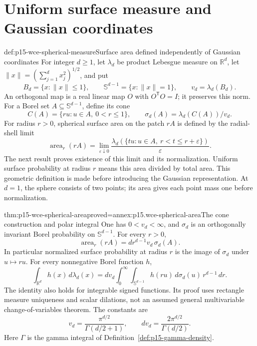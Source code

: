 \section{Uniform surface measure and Gaussian coordinates}
\label{sec:p15-wce-sphere}

\begin{hbdefinition}{def:p15-wce-spherical-measure}{Surface area defined independently of Gaussian coordinates}
For integer \(d\geq1\), let \(\lambda_d\) be product Lebesgue
measure on \(\mathbb R^d\), let
\(\|x\|=(\sum_{j=1}^d x_j^2)^{1/2}\), and put
\[
 B_d=\{x:\|x\|\leq1\},\qquad
 \mathbb S^{d-1}=\{x:\|x\|=1\},\qquad v_d=\lambda_d(B_d).
 \]
An orthogonal map is a real linear map \(O\) with
\(O^{\mathsf T}O=I\); it preserves this norm.
For a Borel set \(A\subseteq\mathbb S^{d-1}\), define its cone
\[
 C(A)=\{ru:u\in A,\ 0<r\leq1\},\qquad
 \sigma_d(A)=\lambda_d(C(A))/v_d.
 \]
For radius \(r>0\), spherical surface area on the patch \(rA\)
is defined by the radial-shell limit
\[
 \operatorname{area}_r(rA)=
 \lim_{\varepsilon\downarrow0}
 \frac{\lambda_d(\{tu:u\in A,\ r<t\leq r+\varepsilon\})}
      {\varepsilon}.
 \]
The next result proves existence of this limit and its normalization.
Uniform surface probability at radius \(r\) means this area
divided by total area. This geometric definition is made before
introducing the Gaussian representation.
At \(d=1\), the sphere consists of two points; its area gives
each point mass one before normalization.
\end{hbdefinition}

\begin{hbtheorem}{thm:p15-wce-spherical-area}{proved=annex:p15.wce-spherical-area}{The cone construction and polar integral}
One has \(0<v_d<\infty\), and \(\sigma_d\) is an
orthogonally invariant Borel probability on \(\mathbb S^{d-1}\).
For every \(r>0\),
\[
 \operatorname{area}_r(rA)=d r^{d-1}v_d\,\sigma_d(A).
 \]
In particular normalized surface probability at radius \(r\)
is the image of \(\sigma_d\) under \(u\mapsto ru\).
For every nonnegative Borel function \(h\),
\[
 \int_{\mathbb R^d}h(x)\,d\lambda_d(x)
 =d v_d\int_0^\infty\int_{\mathbb S^{d-1}}
                       h(ru)\,d\sigma_d(u)\,r^{d-1}\,dr.
 \]
The identity also holds for integrable signed functions.
Its proof uses rectangle measure uniqueness and scalar dilations,
not an assumed general multivariable change-of-variables theorem.
The constants are
\[
 v_d=\frac{\pi^{d/2}}{\Gamma(d/2+1)},\qquad
 d v_d=\frac{2\pi^{d/2}}{\Gamma(d/2)}.
 \]
Here \(\Gamma\) is the gamma integral of
Definition~\ref{def:p15-gamma-density}.
\end{hbtheorem}


